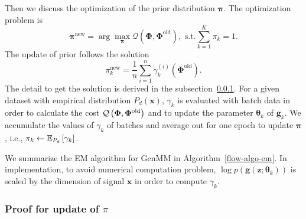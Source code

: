 Then we discuss the optimization of the prior distribution $\bm{\pi}$. The optimization problem is 
\begin{equation}\label{eq-pi-update1}
  \bm{\pi}^{\mathrm{new}} = \displaystyle \arg \max_{\bm{\pi}} \mathcal{Q}
  (\bm{\Phi},\bm{\Phi}^{\mathrm{old}}), \,\,
  \mathrm{s.t.} \sum_{k=1}^{K}\pi_k = 1.
\end{equation}
The update of prior follows the solution
\begin{equation}\label{eq-pi-solution}
  \pi_k^{\mathrm{new}} = \frac{1}{n}\sum_{i=1}^{n}\gamma_k^{(i)}(\bm{\Phi}^{\mathrm{old}}).
\end{equation}
The detail to get the solution is derived in the subsection~\ref{subsubsec:Proof_for_update}. For a given dataset with empirical distribution $P_d(\bm{x})$,
$\gamma_k$ is evaluated with batch data in order to calculate the cost
$\mathcal{Q}\left(\bm{\Phi},\bm{\Phi}^{\mathrm{old}}\right)$ and to update the
parameter $\bm{\theta}_k$ of $\bm{g}_k$. We accumulate the values of $\gamma_k$ of batches and
average out for one epoch to update $\bm{\pi}$, {i.e.}, $\pi_k \gets \mathbb{E}_{P_d}\left[ \gamma_k \right]$.



We summarize the EM algorithm for GenMM in Algorithm~\autoref{flow-algo-em}.
In implementation, to avoid numerical computation problem, $\log{p(\bm{g}(\bm{z}; \bm{\theta}_k))}$ is
scaled by the dimension of signal $\bm{x}$ in order to compute $\gamma_k$. 



\subsubsection{Proof for update of $\pi$}
\label{subsubsec:Proof_for_update}

